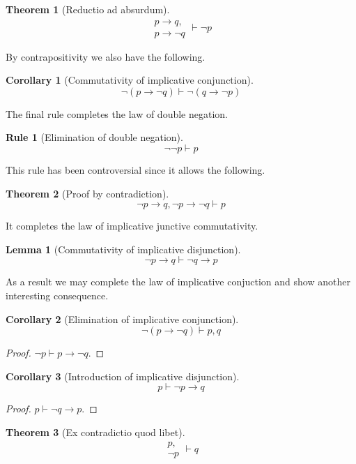 \documentclass{amsbook}
\newcommand{\infers}{\mathrel\vdash}
\newcommand{\then}{\mathrel\rightarrow}
\theoremstyle{definition}
\newtheorem{frule}{Rule}[chapter]
\newtheorem{thm}{Theorem}[section]
\newtheorem{lmm}{Lemma}[section]
\newtheorem{crl}{Corollary}[section]
\begin{document}
\begin{thm}[Reductio ad absurdum]
    $$\begin{aligned}
            p \then q, \\ p \then \neg q
        \end{aligned} \infers \neg p$$
\end{thm}

By contrapositivity we also have the following.

\begin{crl}[Commutativity of implicative conjunction]
    $$\neg(p \then \neg q) \infers \neg(q \then \neg p)$$
\end{crl}

The final rule completes the law of double negation.

\begin{frule}[Elimination of double negation]
    $${\neg\neg p} \infers p$$
\end{frule}

This rule has been controversial since it allows the following.

\begin{thm}[Proof by contradiction]
    $$\neg p \then q, \neg p \then \neg q \infers p$$
\end{thm}

It completes the law of implicative junctive commutativity.

\begin{lmm}[Commutativity of implicative disjunction]
    $$\neg p \then q \infers \neg q \then p$$
\end{lmm}

As a result we may complete the law of implicative conjuction and show another interesting consequence.

\begin{crl}[Elimination of implicative conjunction]
    $$\neg(p \then \neg q) \infers p, q$$
    \begin{proof}
        $\neg p \infers p \then \neg q$.
    \end{proof}
\end{crl}

\begin{crl}[Introduction of implicative disjunction]
    $$p \infers \neg p \then q$$
    \begin{proof}
        $p \infers \neg q \then p$.
    \end{proof}
\end{crl}

\begin{thm}[Ex contradictio quod libet]
    $$\begin{aligned}
            p, \\ \neg p
        \end{aligned}\infers q$$
\end{thm}
\end{document}
